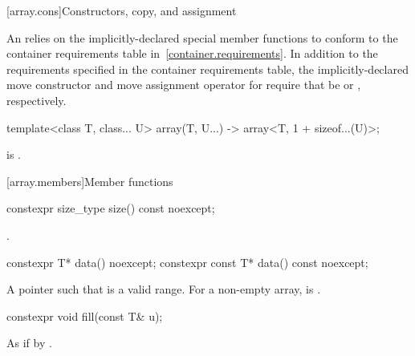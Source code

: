 [array.cons]{Constructors, copy, and assignment}

\pnum
{}%
%
An  relies on the implicitly-declared special
member functions to
conform to the container requirements table in~\ref{container.requirements}.
In addition to the requirements specified in the container requirements table,
the implicitly-declared move constructor and move assignment operator for 
require that  be  or ,
respectively.

\begin{itemdecl}
template<class T, class... U>
  array(T, U...) -> array<T, 1 + sizeof...(U)>;
\end{itemdecl}
\begin{itemdescr}
\pnum
\mandates
{} is .
\end{itemdescr}

[array.members]{Member functions}

%
\begin{itemdecl}
constexpr size_type size() const noexcept;
\end{itemdecl}

\begin{itemdescr}
\pnum
\returns
{}.
\end{itemdescr}

%
\begin{itemdecl}
constexpr T* data() noexcept;
constexpr const T* data() const noexcept;
\end{itemdecl}

\begin{itemdescr}
\pnum
\returns
A pointer such that  is a valid range. For a
non-empty array,  is .
\end{itemdescr}

%
\begin{itemdecl}
constexpr void fill(const T& u);
\end{itemdecl}

\begin{itemdescr}
\pnum
\effects
As if by .
\end{itemdescr}

